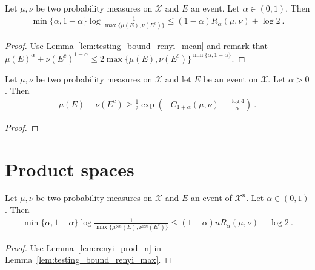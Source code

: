 \begin{lemma}
  \label{lem:testing_bound_renyi_max}
  Let $\mu, \nu$ be two probability measures on $\mathcal X$ and $E$ an event. Let $\alpha \in (0,1)$. Then
  \begin{align*}
  \min\{\alpha, 1 - \alpha\} \log\frac{1}{\max\{\mu(E), \nu(E^c)\}} \le (1 - \alpha) R_{\alpha}(\mu, \nu)  + \log 2 \: .
  \end{align*}
\end{lemma}

\begin{proof}
Use Lemma~\ref{lem:testing_bound_renyi_mean} and remark that $\mu(E)^\alpha + \nu(E^c)^{1 - \alpha} \le 2\max\{\mu(E), \nu(E^c)\}^{\min\{\alpha, 1 - \alpha\}}$.
\end{proof}


\begin{lemma}
  \label{lem:testing_bound_renyi_one_add}
  \leanok
  Let $\mu, \nu$ be two probability measures on $\mathcal X$ and let $E$ be an event on $\mathcal X$. Let $\alpha > 0$. Then
  \begin{align*}
  \mu(E) + \nu(E^c) \ge \frac{1}{2}\exp\left( - C_{1+\alpha}(\mu, \nu) - \frac{\log 4}{\alpha}\right) \: .
  \end{align*}
\end{lemma}

\begin{proof}%
{}
\end{proof}


\section{Product spaces}

\begin{corollary}
  \label{cor:testing_bound_renyi_n}
  Let $\mu, \nu$ be two probability measures on $\mathcal X$ and $E$ an event of $\mathcal X^n$. Let $\alpha \in (0,1)$. Then
  \begin{align*}
  \min\{\alpha, 1 - \alpha\} \log\frac{1}{\max\{\mu^{\otimes n}(E), \nu^{\otimes n}(E^c)\}} \le (1 - \alpha) n R_{\alpha}(\mu, \nu)  + \log 2 \: .
  \end{align*}
\end{corollary}

\begin{proof}
Use Lemma~\ref{lem:renyi_prod_n} in Lemma~\ref{lem:testing_bound_renyi_max}.
\end{proof}

